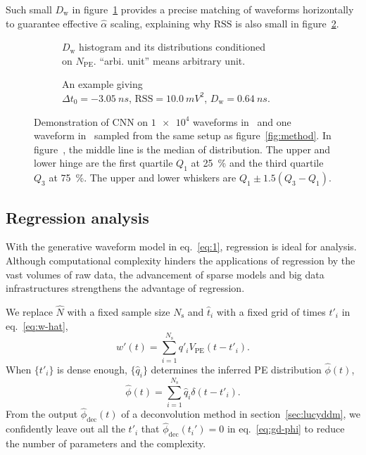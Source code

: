 Such small $D_\mathrm{w}$ in figure~\ref{fig:cnn-npe} provides a precise matching of waveforms horizontally to guarantee effective $\hat{\alpha}$ scaling, explaining why $\mathrm{RSS}$ is also small in figure~\ref{fig:cnn}.

\begin{figure}[H]
  \begin{subfigure}{.5\textwidth}
    \centering
    \resizebox{\textwidth}{!}{}
    \caption{\label{fig:cnn-npe} $D_\mathrm{w}$ histogram and its distributions conditioned \\ on $N_{\mathrm{PE}}$. ``arbi. unit'' means arbitrary unit.}
  \end{subfigure}
  \begin{subfigure}{.5\textwidth}
    \centering
    \resizebox{\textwidth}{!}{}
    \caption{\label{fig:cnn}An example giving \\ $\Delta t_0=\SI{-3.05}{ns}$, $\mathrm{RSS}=\SI{10.0}{mV^2}$, $D_\mathrm{w}=\SI{0.64}{ns}$.}
  \end{subfigure}
  \caption{\label{fig:cnn-performance}Demonstration of CNN on $\num[retain-unity-mantissa=false]{1e4}$ waveforms in~ and one waveform in~ sampled from the same setup as figure~\ref{fig:method}.  In figure~, the middle line is the median of distribution. The upper and lower hinge are the first quartile $Q_1$ at \SI{25}{\percent} and the third quartile $Q_3$ at \SI{75}{\percent}. The upper and lower whiskers are $Q_1 \pm 1.5(Q_3-Q_1)$. }
\end{figure}

\subsection{Regression analysis}
\label{sec:regression}
With the generative waveform model in eq.~\eqref{eq:1}, regression is ideal for analysis. Although computational complexity hinders the applications of regression by the vast volumes of raw data, the advancement of sparse models and big data infrastructures strengthens the advantage of regression.

We replace $\hat{N}$ with a fixed sample size $N_\mathrm{s}$ and $\hat{t}_i$ with a fixed grid of times $t'_i$ in eq.~\eqref{eq:w-hat}, 
\begin{equation}
  \label{eq:gd}
  w'(t) = \sum_{i=1}^{N_\mathrm{s}}q'_iV_\mathrm{PE}(t-t'_i).
\end{equation}
When $\{t'_i\}$ is dense enough, $\{\hat{q}_i\}$ determines the inferred PE distribution $\hat{\phi}(t)$,
\begin{equation}
  \label{eq:gd-phi}
  \hat{\phi}(t) = \sum_{i=1}^{N_\mathrm{s}}\hat{q}_i\delta(t-t'_i).
\end{equation}
From the output $\hat{\phi}_\mathrm{dec}(t)$ of a deconvolution method in section~\ref{sec:lucyddm}, we confidently leave out all the $t'_i$ that $\hat{\phi}_\mathrm{dec}(t_i')=0$ in eq.~\eqref{eq:gd-phi} to reduce the number of parameters and the complexity.


